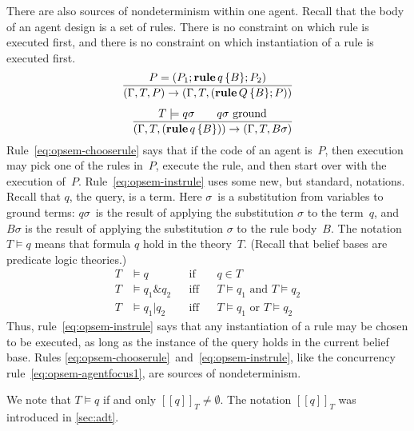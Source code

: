 \documentclass[a4paper,12pt,oneside,fleqn]{book} %
\newcommand{\eval}[1]{[\!\![#1]\!\!]}
\begin{document}
{There are also sources of nondeterminism within one agent. Recall that the
body of an agent design is a set of rules. There is no constraint on which
rule is executed first, and there is no constraint on which instantiation of
a rule is executed first.
\begin{align}
\frac
  {P = (P_1;{\bf rule}\,q\,\{B\};P_2)}
  {(\Gamma,T,P)\to(\Gamma,T,({\bf rule}\,Q\,\{B\};P))}
  \label{eq:opsem-chooserule}
\\[1ex]
\frac
  {T \models q \sigma \qquad\text{$q\sigma$ ground}}
  {(\Gamma,T,({\bf rule}\,q\,\{B\}))\to(\Gamma,T,B\sigma)}
  \label{eq:opsem-instrule}
\end{align}
Rule~\eqref{eq:opsem-chooserule} says that if the code of an agent is~$P$,
then execution may pick one of the rules in~$P$, execute the rule, and then
start over with the execution of~$P$. Rule~\eqref{eq:opsem-instrule} uses
some new, but standard, notations. Recall that $q$, the query, is a term.
Here $\sigma$~is a substitution from variables to ground terms: $q\sigma$~is the result of applying the substitution $\sigma$ to the term~$q$, and
$B\sigma$ is the result of applying the substitution $\sigma$ to the rule
body~$B$. The notation $T\models q$ means that formula $q$ hold in the
theory~$T$. (Recall that belief bases are predicate logic theories.)
\begin{align}
T &\models q  &&\text{if} && q\in T \\
T &\models q_1\&q_2 &&\text{iff} &&\text{$T\models q_1$ and $T\models q_2$}\\
T &\models q_1|q_2 &&\text{iff} &&\text{$T\models q_1$ or $T\models q_2$}
\end{align}
Thus, rule~\eqref{eq:opsem-instrule} says that any instantiation of a rule
may be chosen to be executed, as long as the instance of the query holds in
the current belief base. Rules
\eqref{eq:opsem-chooserule}~and~\eqref{eq:opsem-instrule}, like the
concurrency rule~\eqref{eq:opsem-agentfocus1}, are sources of
nondeterminism.

\begin{remark}
We note that $T \models q$ if and only $\eval{q}_T\neq\emptyset$.
The notation $\eval{q}_T$ was introduced in \autoref{sec:adt}.
\end{remark}

}
\end{document}
